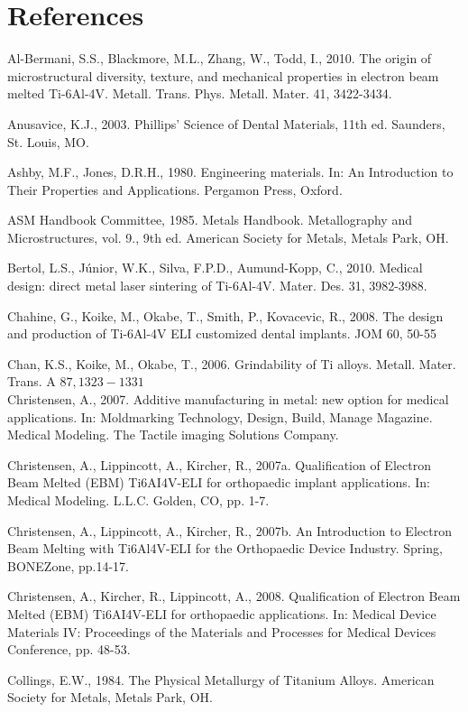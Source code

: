 \documentclass[10pt]{article}
\begin{document}
\section*{References}
Al-Bermani, S.S., Blackmore, M.L., Zhang, W., Todd, I., 2010. The origin of microstructural diversity, texture, and mechanical properties in electron beam melted Ti-6Al-4V. Metall. Trans. Phys. Metall. Mater. 41, 3422-3434.

Anusavice, K.J., 2003. Phillips' Science of Dental Materials, 11th ed. Saunders, St. Louis, MO.

Ashby, M.F., Jones, D.R.H., 1980. Engineering materials. In: An Introduction to Their Properties and Applications. Pergamon Press, Oxford.

ASM Handbook Committee, 1985. Metals Handbook. Metallography and Microstructures, vol. 9., 9th ed. American Society for Metals, Metals Park, OH.

Bertol, L.S., Júnior, W.K., Silva, F.P.D., Aumund-Kopp, C., 2010. Medical design: direct metal laser sintering of Ti-6Al-4V. Mater. Des. 31, 3982-3988.

Chahine, G., Koike, M., Okabe, T., Smith, P., Kovacevic, R., 2008. The design and production of Ti-6Al-4V ELI customized dental implants. JOM 60, 50-55

Chan, K.S., Koike, M., Okabe, T., 2006. Grindability of Ti alloys. Metall. Mater. Trans. A $87,1323-1331$\\
Christensen, A., 2007. Additive manufacturing in metal: new option for medical applications. In: Moldmarking Technology, Design, Build, Manage Magazine. Medical Modeling. The Tactile imaging Solutions Company.

Christensen, A., Lippincott, A., Kircher, R., 2007a. Qualification of Electron Beam Melted (EBM) Ti6AI4V-ELI for orthopaedic implant applications. In: Medical Modeling. L.L.C. Golden, CO, pp. 1-7.

Christensen, A., Lippincott, A., Kircher, R., 2007b. An Introduction to Electron Beam Melting with Ti6Al4V-ELI for the Orthopaedic Device Industry. Spring, BONEZone, pp.14-17.

Christensen, A., Kircher, R., Lippincott, A., 2008. Qualification of Electron Beam Melted (EBM) Ti6AI4V-ELI for orthopaedic applications. In: Medical Device Materials IV: Proceedings of the Materials and Processes for Medical Devices Conference, pp. 48-53.

Collings, E.W., 1984. The Physical Metallurgy of Titanium Alloys. American Society for Metals, Metals Park, OH.
\end{document}
